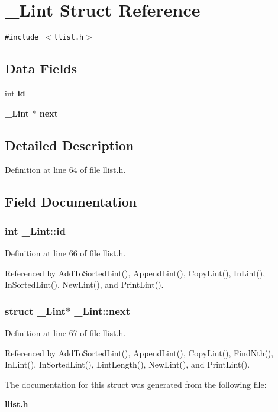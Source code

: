 \section{\_\-Lint Struct Reference}
\label{struct__Lint}
{\tt \#include $<$llist.h$>$}

\subsection*{Data Fields}
\begin{CompactItemize}
\item 
int \bf{id}
\item 
\bf{\_\-Lint} $\ast$ \bf{next}
\end{CompactItemize}


\subsection{Detailed Description}




Definition at line 64 of file llist.h.

\subsection{Field Documentation}
\subsubsection{\setlength{\rightskip}{0pt plus 5cm}int \bf{\_\-Lint::id}}\label{struct__Lint_af0bc646ba3ceb8d78c4b6dfe82fb2cd}




Definition at line 66 of file llist.h.

Referenced by Add\-To\-Sorted\-Lint(), Append\-Lint(), Copy\-Lint(), In\-Lint(), In\-Sorted\-Lint(), New\-Lint(), and Print\-Lint().
\subsubsection{\setlength{\rightskip}{0pt plus 5cm}struct \bf{\_\-Lint}$\ast$ \bf{\_\-Lint::next}}\label{struct__Lint_49e70d19f8c988abbb92e2fa1faf6255}




Definition at line 67 of file llist.h.

Referenced by Add\-To\-Sorted\-Lint(), Append\-Lint(), Copy\-Lint(), Find\-Nth(), In\-Lint(), In\-Sorted\-Lint(), Lint\-Length(), New\-Lint(), and Print\-Lint().

The documentation for this struct was generated from the following file:\begin{CompactItemize}
\item 
\bf{llist.h}\end{CompactItemize}
